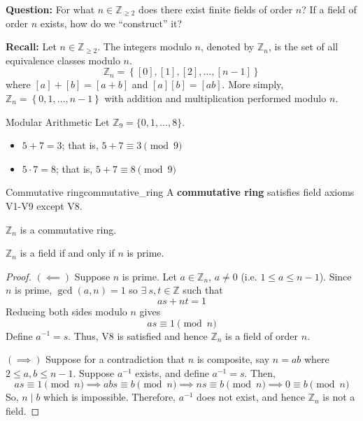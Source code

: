 \textbf{Question:} For what $ n\in\mathbb{Z}_{\geqslant 2} $ does there exist
finite fields of order $ n $? If a field of order $ n $ exists, how do
we ``construct'' it?

\textbf{Recall:} Let $ n\in\mathbb{Z}_{\geqslant 2} $.
The integers modulo $ n $, denoted by
$ \mathbb{Z}_n $, is the set of all equivalence classes modulo $ n $.
\[ \mathbb{Z}_n=\left\{ [0],[1],[2],\ldots ,[n-1]\right\} \]
where $ [a]+[b]=[a+b] $ and $ [a][b]=[ab] $.
More simply, $ \mathbb{Z}_{n}=\left\{ 0,1,\ldots ,n-1\right\} $
with addition and multiplication performed modulo $ n $.

\begin{Example}{Modular Arithmetic}{}
    Let $ \mathbb{Z}_9=\{0,1,\ldots ,8\} $.
    \begin{itemize}
        \item $ 5+7=3 $; that is, $ 5+7\equiv 3 \pmod{9} $
        \item $ 5\cdot 7=8 $; that is, $ 5+7\equiv 8 \pmod{9} $
    \end{itemize}
\end{Example}

\begin{Definition}{Commutative ring}{commutative_ring}
    A \textbf{commutative ring} satisfies field axioms V1-V9 except
    V8.
\end{Definition}

\begin{Theorem}{}{}
    $ \mathbb{Z}_n $ is a commutative ring.
\end{Theorem}

\begin{Theorem}{}{}
    $ \mathbb{Z}_n $ is a field if and only if $ n $ is prime.
\end{Theorem}

\begin{proof}
    $ (\impliedby) $ Suppose $ n $ is prime. Let $ a\in\mathbb{Z}_n $, $ a\neq 0 $
    (i.e. $ 1\leqslant a\leqslant n-1 $). Since $ n $ is prime, $ \gcd(a,n)=1 $
    so $ \exists\ s,t\in\mathbb{Z} $ such that
    \[ as+nt=1 \]
    Reducing both sides modulo $ n $ gives
    \[ as\equiv 1 \pmod{n} \]
    Define $ a^{-1}=s $. Thus, V8 is satisfied and hence $ \mathbb{Z}_n $
    is a field of order $ n $.

    $ (\implies) $ Suppose for a contradiction that $ n $ is composite, say $ n=ab $
    where $ 2\leqslant a,b\leqslant n-1 $. Suppose $ a^{-1} $ exists, and define
    $ a^{-1}=s $. Then,
    \[ as\equiv 1 \pmod{n}\implies abs\equiv b\pmod{n}\implies ns\equiv b \pmod{n}
        \implies 0\equiv b\pmod{n} \]
    So, $ n\mid b $ which is impossible. Therefore, $ a^{-1} $ does not exist, and hence
    $ \mathbb{Z}_n $ is not a field.
\end{proof}

